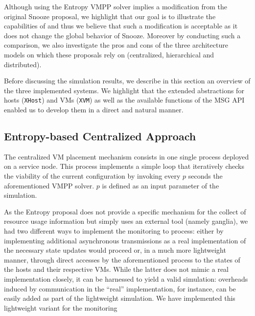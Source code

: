 %
Although using the Entropy VMPP solver
implies a modification from the original Snooze proposal,  we
highlight that our goal is to illustrate the capabilities of \vmps and
thus we believe that such a modification is acceptable as it does not
change the global behavior of Snooze. Moreover by
conducting such a comparison, we also investigate the pros and cons of
the three  architecture models on which these proposals rely on (\ie centralized, hierarchical and
distributed).

%
Before discussing the simulation results, we
describe in this section an overview of the three implemented systems.
We highlight that the extended abstractions for hosts (\texttt{XHost})
and VMs (\texttt{XVM}) as well as the available functions of the \sg
MSG API enabled us to develop them in a direct and natural manner.


\subsection{Entropy-based Centralized Approach}
\label{subsec:entropy}
The centralized VM placement mechanism consists in one single \sg
process deployed on a service node. This process implements a simple loop that
iteratively checks the viability of the current configuration by
invoking every $p$ seconds the aforementioned VMPP solver. $p$ is
defined as an input parameter of the simulation.


As the Entropy proposal does not provide a specific mechanism for the
collect of resource usage information but simply uses an external tool
(namely ganglia), we had two different ways to implement the monitoring to
process:  either by implementing additional asynchronous transmissions
as a real implementation of the necessary state updates would proceed
or, in a much more lightweight manner, through direct accesses by the
aforementioned process to the states of the hosts and their respective
VMs. While the latter does not mimic a real implementation closely, it
can be harnessed to yield a valid simulation: overheads induced by
communication in the ``real'' implementation, for instance, can be
easily added as part of the lightweight simulation. We have
implemented this lightweight variant for the monitoring

